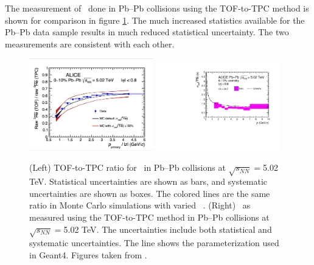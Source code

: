 The measurement of \sigmainel\ done in Pb--Pb collisions using the TOF-to-TPC method is shown for comparison in figure \ref{fig:Ahe_sigma_inel_PbPb}. The much increased statistics available for the Pb--Pb data sample results in much reduced statistical uncertainty. The two measurements are consistent with each other.

\begin{figure}
    \centering
    \includegraphics[width=0.48\textwidth]{figures/he3bar_TOF-to-TPC-ratio.png}
    \includegraphics[width=0.48\textwidth]{figures/Antihelium_inelastic_cross_section_PbPb.pdf}
    \caption{(Left) TOF-to-TPC ratio for \ahe\ in Pb--Pb collisions at $\sqrt{s_{NN}}=$5.02 TeV. Statistical uncertainties are shown as bars, and systematic uncertainties are shown as boxes. The colored lines are the same ratio in Monte Carlo simulations with varied \sigmainel\ . (Right) \sigmainel\ as measured using the TOF-to-TPC method in Pb--Pb collisions at $\sqrt{s_{NN}}=$5.02 TeV. The uncertainties include both statistical and systematic uncertainties. The line shows the parameterization used in Geant4. Figures taken from \cite{antiHe3XS}.}
    \label{fig:Ahe_sigma_inel_PbPb}
\end{figure}

